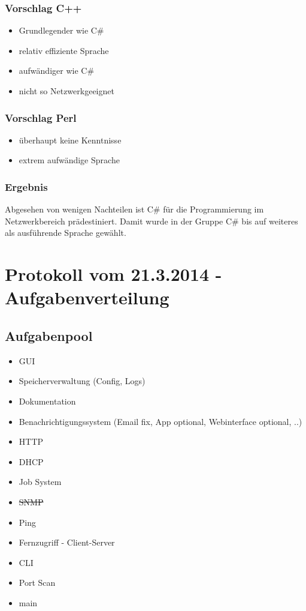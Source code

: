 \documentclass[10pt,a4paper]{report}
\begin{document}
\subsection{Vorschlag C++}
\begin{itemize}
\item Grundlegender wie C\#
\item relativ effiziente Sprache 
\item aufwändiger wie C\#
\item nicht so Netzwerkgeeignet
\end{itemize}
\subsection{Vorschlag Perl}
\begin{itemize}
\item überhaupt keine Kenntnisse 
\item extrem aufwändige Sprache 
\end{itemize}
\subsection{Ergebnis}
Abgesehen von wenigen Nachteilen ist C\# für die Programmierung im Netzwerkbereich prädestiniert. Damit wurde in der Gruppe C\# bis auf weiteres als ausführende Sprache gewählt.
\chapter{Protokoll vom 21.3.2014 - Aufgabenverteilung}
\section{Aufgabenpool}
\begin{itemize}
\item GUI
\item Speicherverwaltung (Config, Logs)
\item Dokumentation
\item Benachrichtigungssystem (Email fix, App optional, Webinterface optional, ..)
\item HTTP
\item DHCP
\item Job System
\item \sout{SNMP}
\item Ping
\item Fernzugriff - Client-Server
\item CLI
\item Port Scan
\item main
\end{itemize}
\end{document}
